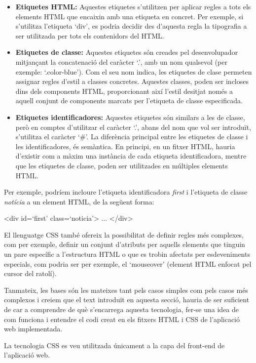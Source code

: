     \begin{itemize}
        \item \textbf{Etiquetes HTML:}  Aquestes etiquetes s'utilitzen per aplicar regles a tots els elements HTML que encaixin amb una etiqueta en concret. Per exemple, si s'utilitza l'etiqueta `div', es podria decidir des d’aquesta regla la tipografia a ser utilitzada per tots els contenidors del HTML.
        \item \textbf{Etiquetes de classe:} Aquestes etiquetes són creades pel desenvolupador mitjançant la concatenació del caràcter `.', amb un nom qualsevol (per exemple: `.color-blue’). Com el seu nom indica, les etiquetes de clase permeten assignar regles d'estil a classes concretes. Aquestes classes, poden ser incloses dins dels components HTML, proporcionant així l'estil desitjat només a aquell conjunt de components marcats per l'etiqueta de classe especificada.
        \item \textbf{Etiquetes identificadores:} Aquestes etiquetes són similars a les de classe, però en comptes d'utilitzar el caràcter `.', abans del nom que vol ser introduït, s'utilitza el caràcter `\#'. La diferència principal entre les etiquetes de classe i les identificadores, és semàntica. En principi, en un fitxer HTML, hauria d’existir com a màxim una instància de cada etiqueta identificadora, mentre que les etiquetes de classe, poden ser utilitzades en múltiples elements HTML.
    \end{itemize}

    Per exemple, podríem incloure l’etiqueta identificadora \emph{first} i l’etiqueta de classe \emph{notícia} a un element HTML, de la següent forma:

    \begin{displayquote}
        <div id=`first’ class=`noticia’> ... </div>
    \end{displayquote}

    El llenguatge CSS també ofereix la possibilitat de definir regles més complexes, com per exemple, definir un conjunt d'atributs per aquells elements que tinguin un pare específic a l’estructura HTML o que es trobin afectats per esdeveniments especials, com podria ser per exemple, el `mouseover’ (element HTML enfocat pel cursor del ratolí).

    Tanmateix, les bases són les mateixes tant pels casos simples com pels casos més complexos i creiem que el text introduït en aquesta secció, hauria de ser suficient de car a comprendre de què s’encarrega aquesta tecnologia, fer-se una idea de com funciona i entendre el codi creat en els fitxers HTML i CSS de l'aplicació web implementada.

    La tecnologia CSS es veu utilitzada únicament a la capa del front-end de l'aplicació web.
